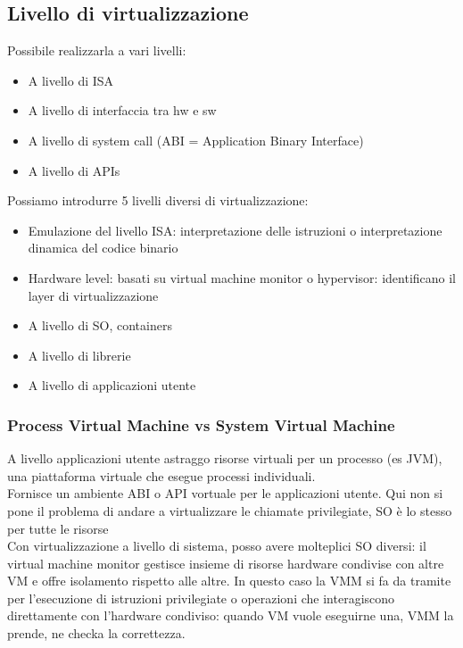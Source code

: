 \documentclass[16px]{article}
\begin{document}
\subsection{Livello di virtualizzazione}
Possibile realizzarla a vari livelli:
\begin{itemize}
\item A livello di ISA
\item A livello di interfaccia tra hw e sw
\item A livello di system call (ABI = Application Binary Interface)
\item A livello di APIs
\end{itemize}
Possiamo introdurre 5 livelli diversi di virtualizzazione:
\begin{itemize}
\item Emulazione del livello ISA: interpretazione delle istruzioni o interpretazione dinamica del codice binario
\item Hardware level: basati su virtual machine monitor o hypervisor: identificano il layer di virtualizzazione
\item A livello di SO, containers
\item A livello di librerie
\item A livello di applicazioni utente
\end{itemize}
\subsubsection{Process Virtual Machine vs System Virtual Machine}
A livello applicazioni utente astraggo risorse virtuali per un processo (es JVM), una piattaforma virtuale che esegue processi individuali.\\ Fornisce un ambiente ABI o API vortuale per le applicazioni utente. Qui non si pone il problema di andare a virtualizzare le chiamate privilegiate, SO è lo stesso per tutte le risorse\\ Con virtualizzazione a livello di sistema, posso avere molteplici SO diversi: il virtual machine monitor gestisce insieme di risorse hardware condivise con altre VM e offre isolamento rispetto alle altre. In questo caso la VMM si fa da tramite per l'esecuzione di istruzioni privilegiate o operazioni che interagiscono direttamente con l'hardware condiviso: quando VM vuole eseguirne una, VMM la prende, ne checka la correttezza.
\end{document}
